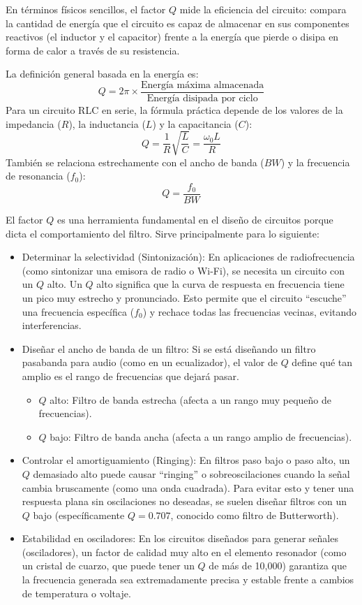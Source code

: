 En términos físicos sencillos, el factor \(Q\) mide la eficiencia del circuito: compara la cantidad de energía que el circuito es capaz de almacenar en sus componentes reactivos (el inductor y el capacitor) frente a la energía que pierde o disipa en forma de calor a través de su resistencia.

La definición general basada en la energía es:
\[
  Q = 2\pi \times \frac{\text{Energía máxima almacenada}}{\text{Energía disipada por ciclo}}
\]
Para un circuito RLC en serie, la fórmula práctica depende de los valores de la impedancia (\(R\)), la inductancia (\(L\)) y la capacitancia (\(C\)):
\begin{equation}
  Q = \frac{1}{R} \sqrt{\frac{L}{C}} = \frac{\omega_0 L}{R}
\end{equation}
También se relaciona estrechamente con el ancho de banda (\(BW\)) y la frecuencia de resonancia (\(f_0\)):
\[
  Q = \frac{f_0}{BW}
\]

El factor \(Q\) es una herramienta fundamental en el diseño de circuitos porque dicta el comportamiento del filtro. Sirve principalmente para lo siguiente:
\begin{itemize}
  \item Determinar la selectividad (Sintonización): En aplicaciones de radiofrecuencia (como sintonizar una emisora de radio o Wi-Fi), se necesita un circuito con un \(Q\) alto. Un \(Q\) alto significa que la curva de respuesta en frecuencia tiene un pico muy estrecho y pronunciado. Esto permite que el circuito ``escuche'' una frecuencia específica (\(f_0\)) y rechace todas las frecuencias vecinas, evitando interferencias.
  \item Diseñar el ancho de banda de un filtro: Si se está diseñando un filtro pasabanda para audio (como en un ecualizador), el valor de \(Q\) define qué tan amplio es el rango de frecuencias que dejará pasar. 
    \begin{itemize}
      \item \(Q\) alto: Filtro de banda estrecha (afecta a un rango muy pequeño de frecuencias).
      \item \(Q\) bajo: Filtro de banda ancha (afecta a un rango amplio de frecuencias).
    \end{itemize}
  \item Controlar el amortiguamiento (Ringing): En filtros paso bajo o paso alto, un \(Q\) demasiado alto puede causar ``ringing'' o sobreoscilaciones cuando la señal cambia bruscamente (como una onda cuadrada). Para evitar esto y tener una respuesta plana sin oscilaciones no deseadas, se suelen diseñar filtros con un \(Q\) bajo (específicamente \(Q = 0.707\), conocido como filtro de Butterworth).
  \item Estabilidad en osciladores: En los circuitos diseñados para generar señales (osciladores), un factor de calidad muy alto en el elemento resonador (como un cristal de cuarzo, que puede tener un \(Q\) de más de 10,000) garantiza que la frecuencia generada sea extremadamente precisa y estable frente a cambios de temperatura o voltaje.
\end{itemize}

